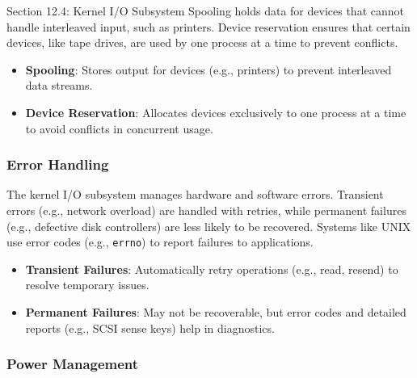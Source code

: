 \begin{notes}{Section 12.4: Kernel I/O Subsystem}
    Spooling holds data for devices that cannot handle interleaved input, such as printers. Device reservation ensures that certain devices, like tape drives, are used by one process at a time to prevent conflicts.
    
    \begin{highlight}
    
        \begin{itemize}
            \item \textbf{Spooling}: Stores output for devices (e.g., printers) to prevent interleaved data streams.
            \item \textbf{Device Reservation}: Allocates devices exclusively to one process at a time to avoid conflicts in concurrent usage.
        \end{itemize}
    
    \end{highlight}
    
    \subsubsection*{Error Handling}
    
    The kernel I/O subsystem manages hardware and software errors. Transient errors (e.g., network overload) are handled with retries, while permanent failures (e.g., defective disk controllers) are 
    less likely to be recovered. Systems like UNIX use error codes (e.g., \texttt{errno}) to report failures to applications.
    
    \begin{highlight}
    
        \begin{itemize}
            \item \textbf{Transient Failures}: Automatically retry operations (e.g., read, resend) to resolve temporary issues.
            \item \textbf{Permanent Failures}: May not be recoverable, but error codes and detailed reports (e.g., SCSI sense keys) help in diagnostics.
        \end{itemize}
    
    \end{highlight}
    
    \subsubsection*{Power Management}
    

\end{notes}
